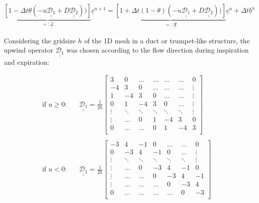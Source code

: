 \begin{equation} \label{eqn:advection_diffusion_discr2}
\underbrace{\left[1 - \Delta t \theta(-u\underline{\underline{\mathcal{D}_1}} + D \underline{\underline{\mathcal{D}_2}})) \right]}_{=:\underline{\underline{\mathcal{L}}}} \underline{c}^{n+1} = \underbrace{\left[1 + \Delta t(1-\theta)(-u\underline{\underline{\mathcal{D}_1}} + D \underline{\underline{\mathcal{D}_2}})) \right]}_{=:\underline{\underline{\mathcal{R}}}} \underline{c}^{n}  + \Delta t\underline{b}^n
\end{equation}

Considering the gridsize $h$ of the 1D mesh in a duct or trumpet-like structure, the upwind operator $\underline{\underline{\mathcal{D}_1}}$ was chosen according to the flow direction during inspiration and expiration:

\begin{equation}
\begin{split}
\text{if }u \geq 0 \text{:}&\quad
\underline{\underline{\mathcal{D}_1}} = \frac{1}{2h}
\left[\begin{array}{ccccccc} 3 &  0 &  \dots & \dots & \dots & \dots & 0 \\
                            -4 &  3 &  0 & \dots & \dots & \dots & \vdots  \\
                             1 & -4 &  3 & 0 & \dots & \dots & \vdots \\
                             0 &  1 & -4 &  3  & 0 & \dots & \vdots \\
                             \vdots  & \ddots & \ddots & \ddots  &\ddots & \ddots & \vdots \\
                             \vdots  & \dots & 0 & 1 & -4 & 3 & 0 \\
                             0 & \dots & \dots & 0 & 1 & -4 & 3 \\\end{array}\right] \\ \\
\text{if }u < 0 \text{:}&\quad
\underline{\underline{\mathcal{D}_1}} = \frac{1}{2h}
\left[\begin{array}{ccccccc} -3 &  4 &  -1 & 0 & \dots & \dots & 0 \\
                              0 & -3 & 4 & -1 & 0 & \dots & \vdots  \\
                              \vdots & \ddots & \ddots & \ddots & \ddots & \ddots & \vdots \\
                              \vdots &  \dots & 0 & -3 & 4 & -1 & 0 \\
                              \vdots  & \dots & \dots & 0 & -3 & 4 & -1 \\
                              \vdots  & \dots & \dots & \dots & 0 & -3 & 4 \\
                              0 & \dots & \dots & \dots & \dots & 0 & -3 \\\end{array}\right]
\end{split}
\end{equation}

